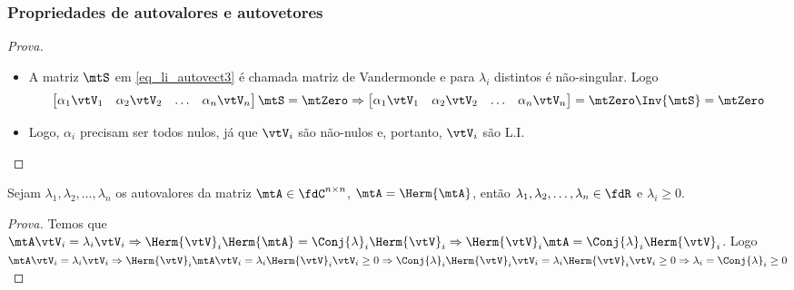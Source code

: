 \begin{frame}
  \frametitle{Propriedades de autovalores e autovetores}
  \vspace{-0.25\baselineskip}
  \begin{proof}[Prova]
    \begin{itemize}
      \item A matriz $\mtS$ em \eqref{eq_li_autovect3} é chamada \alert{matriz de Vandermonde} e para $\lambda_i$ distintos é não-singular. Logo
      \begin{equation}\label{eq_li_autovect4}
        \begin{bmatrix}
          \alpha_1 \vtV_1 & \alpha_2 \vtV_2 & \ldots & \alpha_n \vtV_n
        \end{bmatrix}
        \mtS = \mtZero \Rightarrow
        \begin{bmatrix}
          \alpha_1 \vtV_1 & \alpha_2 \vtV_2 & \ldots & \alpha_n \vtV_n
        \end{bmatrix}
        = \mtZero \Inv{\mtS} = \mtZero
      \end{equation}
      \item Logo, $\alpha_i$ precisam ser todos nulos, já que $\vtV_i$ são não-nulos e, portanto, $\vtV_i$ são L.I.
    \end{itemize}
  \end{proof}
  \vspace{-0.25\baselineskip}
  \begin{propriedade}
    Sejam $\lambda_1, \lambda_2, \ldots, \lambda_n$ os autovalores da matriz $\mtA \in \fdC^{n \times n}$, $\mtA = \Herm{\mtA}$, então $\lambda_1, \lambda_2, \ldots, \lambda_n \in \fdR$ e $\lambda_i \geq 0$.
  \end{propriedade}
  \vspace{-0.25\baselineskip}
  \begin{proof}[Prova]
    Temos que $\mtA \vtV_i = \lambda_i \vtV_i \Rightarrow \Herm{\vtV}_i \Herm{\mtA}  = \Conj{\lambda}_i \Herm{\vtV}_i \Rightarrow \Herm{\vtV}_i \mtA  = \Conj{\lambda}_i \Herm{\vtV}_i$. Logo \\
    $\mtA \vtV_i = \lambda_i \vtV_i \Rightarrow \Herm{\vtV}_i \mtA \vtV_i = \lambda_i \Herm{\vtV}_i \vtV_i \geq 0 \Rightarrow \Conj{\lambda}_i \Herm{\vtV}_i \vtV_i = \lambda_i \Herm{\vtV}_i \vtV_i \geq 0 \Rightarrow \lambda_i = \Conj{\lambda}_i \geq 0$
  \end{proof}
\end{frame}

